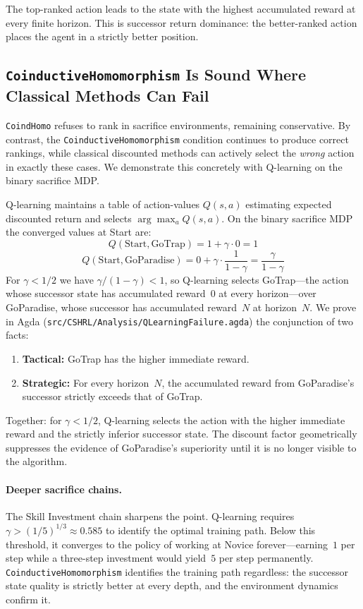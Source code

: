 \documentclass[runningheads]{llncs}
\newcommand{\fpath}[1]{\nolinkurl{#1}}
\begin{document}
\noindent The top-ranked action leads to the state with the highest accumulated reward at every finite horizon.  This is successor return dominance: the better-ranked action places the agent in a strictly better position.

\subsection{\texttt{CoinductiveHomomorphism} Is Sound Where Classical Methods Can Fail}

\texttt{CoindHomo} refuses to rank in sacrifice environments, remaining conservative.  By contrast, the \texttt{CoinductiveHomomorphism} condition continues to produce correct rankings, while classical discounted methods can actively select the \emph{wrong} action in exactly these cases.  We demonstrate this concretely with Q-learning on the binary sacrifice MDP.

Q-learning maintains a table of action-values $Q(s,a)$ estimating expected discounted return and selects $\arg\max_a Q(s,a)$.  On the binary sacrifice MDP the converged values at Start are:
\[
Q(\text{Start}, \text{GoTrap}) = 1 + \gamma \cdot 0 = 1
\]
\[
Q(\text{Start}, \text{GoParadise}) = 0 + \gamma \cdot \frac{1}{1-\gamma} = \frac{\gamma}{1-\gamma}
\]
For $\gamma < 1/2$ we have $\gamma/(1-\gamma) < 1$, so Q-learning selects GoTrap---the action whose successor state has accumulated reward~$0$ at every horizon---over GoParadise, whose successor has accumulated reward~$N$ at horizon~$N$.  We prove in Agda (\fpath{src/CSHRL/Analysis/QLearningFailure.agda}) the conjunction of two facts:
\begin{enumerate}
\item \textbf{Tactical:} GoTrap has the higher immediate reward.
\item \textbf{Strategic:} For every horizon~$N$, the accumulated reward from GoParadise's successor strictly exceeds that of GoTrap.
\end{enumerate}
Together: for $\gamma < 1/2$, Q-learning selects the action with the higher immediate reward and the strictly inferior successor state.  The discount factor geometrically suppresses the evidence of GoParadise's superiority until it is no longer visible to the algorithm.

\paragraph{Deeper sacrifice chains.}
The Skill Investment chain sharpens the point.  Q-learning requires $\gamma > (1/5)^{1/3} \approx 0.585$ to identify the optimal training path.  Below this threshold, it converges to the policy of working at Novice forever---earning~$1$ per step while a three-step investment would yield~$5$ per step permanently.  \texttt{CoinductiveHomomorphism} identifies the training path regardless: the successor state quality is strictly better at every depth, and the environment dynamics confirm it.
\end{document}
